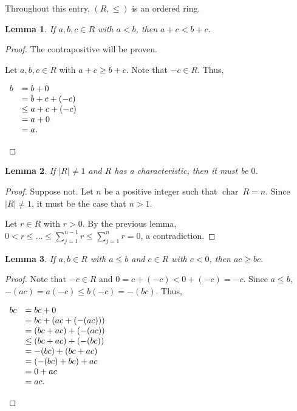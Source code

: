 \documentclass[12pt]{article}
\newtheorem{lem}{Lemma}
\begin{document}
Throughout this entry, $(R, \le)$ is an ordered ring.

\begin{lem}
If $a,b,c \in R$ with $a<b$, then $a+c<b+c$.
\end{lem}

\begin{proof}
The contrapositive will be proven.

Let $a,b,c \in R$ with $a+c \ge b+c$.  Note that $-c \in R$.  Thus,

\begin{center}
$\begin{array}{rl}
b & =b+0 \\
& =b+c+(-c) \\
& \le a+c+(-c) \\
& =a+0 \\
& =a. \qedhere \end{array}$
\end{center}
\end{proof}

\begin{lem}
If $|R| \neq 1$ and $R$ has a characteristic, then it must be $0$.
\end{lem}

\begin{proof}
Suppose not.  Let $n$ be a positive integer such that $\operatorname{char}~R=n$.    Since $|R| \neq 1$, it must be the case that $n>1$.

Let $r \in R$ with $r>0$.  By the previous lemma, $\displaystyle 0<r \le \ldots \le \sum_{j=1}^{n-1} r \le \sum_{j=1}^n r=0$, a contradiction.
\end{proof}

\begin{lem}
If $a,b \in R$ with $a \le b$ and $c \in R$ with $c<0$, then $ac \ge bc$.
\end{lem}

\begin{proof}
Note that $-c \in R$ and $0=c+(-c)<0+(-c)=-c$.  Since $a \le b$, $-(ac)=a(-c) \le b(-c)=-(bc)$.  Thus,

\begin{center}
$\begin{array}{rl}
bc & =bc+0 \\
& =bc+(ac+(-(ac))) \\
& =(bc+ac)+(-(ac)) \\
& \le (bc+ac)+(-(bc)) \\
& =-(bc)+(bc+ac) \\
& =(-(bc)+bc)+ac \\
& =0+ac \\
& =ac. \qedhere \end{array}$
\end{center}
\end{proof}
\end{document}
